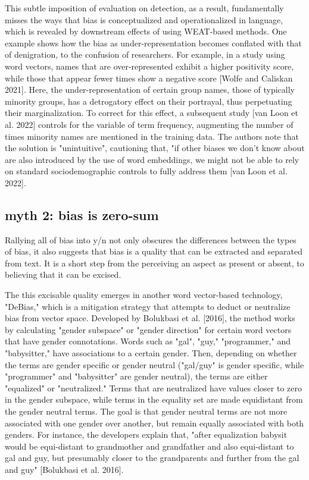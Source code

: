 \documentclass[11pt]{article}
\begin{document}
This subtle imposition of evaluation on detection, as a result,
fundamentally misses the ways that bias is conceptualized and
operationalized in language, which is revealed by downstream effects
of using WEAT-based methods. One example shows how the bias as
under-representation becomes conflated with that of denigration, to
the confusion of researchers. For example, in a study using word
vectors, names that are over-represented exhibit a higher positivity
score, while those that appear fewer times show a negative score
[Wolfe and Caliskan 2021]. Here, the under-representation of certain
group names, those of typically minority groups, has a detrogatory
effect on their portrayal, thus perpetuating their marginalization. To
correct for this effect, a subsequent study [van Loon et al. 2022]
controls for the variable of term frequency, augmenting the number of
times minority names are mentioned in the training data. The authors
note that the solution is "unintuitive", cautioning that, "if other
biases we don’t know about are also introduced by the use of word
embeddings, we might not be able to rely on standard sociodemographic
controls to fully address them [van Loon et al. 2022].

\subsection{myth 2: bias is zero-sum}
\label{sec:org453abe6}
Rallying all of bias into y/n not only obscures the differences
between the types of bias, it also suggests that bias is a quality
that can be extracted and separated from text. It is a short step from
the perceiving an aspect as present or absent, to believing that it
can be excised.

The this excisable quality emerges in another word vector-based
technology, "DeBias," which is a mitigation strategy that attempts to
deduct or neutralize bias from vector space. Developed by Bolukbasi et
al. [2016], the method works by calculating "gender subspace" or
"gender direction" for certain word vectors that have gender
connotations. Words such as "gal", "guy," "programmer," and
"babysitter," have associations to a certain gender. Then, depending
on whether the terms are gender specific or gender neutral ("gal/guy"
is gender specific, while "programmer" and "babysitter" are gender
neutral), the terms are either "equalized" or "neutralized." Terms
that are neutralized have values closer to zero in the gender
subspace, while terms in the equality set are made equidistant from
the gender neutral terms. The goal is that gender neutral terms are
not more associated with one gender over another, but remain equally
associated with both genders. For instance, the developers explain
that, "after equalization babysit would be equi-distant to grandmother
and grandfather and also equi-distant to gal and guy, but presumably
closer to the grandparents and further from the gal and guy"
[Bolukbasi et al. 2016].
\end{document}
